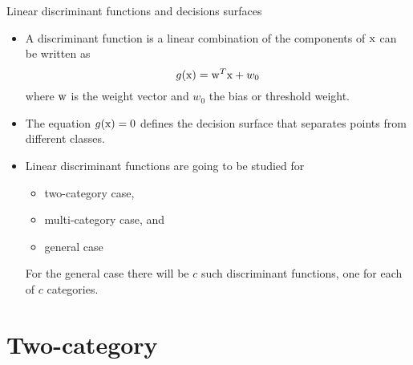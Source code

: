 \begin{frame}{Linear discriminant functions and decisions surfaces}
\begin{itemize}
\item A {\color{mycolor1}discriminant function} is a linear combination of the components of ${\rm x}$ can be written as
\begin{equation}
g({\rm x})={\rm w}^T{\rm x}+w_0 \nonumber
\end{equation}
where ${\rm w}$ is the {\color{mycolor2}weight vector} and $w_0$ the {\color{mycolor4}bias} or {\color{mycolor4}threshold} weight.
\item The equation $g({\rm x}) = 0$ defines the {\color{mycolor1}decision surface} that separates points from different classes.
\item Linear discriminant functions are going to be studied for 
\begin{itemize}
\item two-category case,
\item multi-category case, and
\item general case
\end{itemize} 
For the general case
there will be $c$ such discriminant functions, one for each of $c$ categories.\nocite{duda2012pattern}
\end{itemize}
\end{frame}

\section{Two-category}
